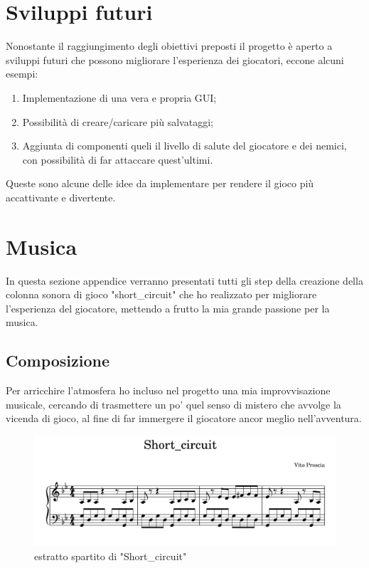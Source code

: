 \documentclass[italian,12pt,a4paper]{article}
\begin{document}
	\section{Sviluppi futuri}
	
	Nonostante il raggiungimento degli obiettivi preposti il progetto è aperto a sviluppi futuri che possono migliorare l'esperienza dei giocatori, eccone alcuni esempi:
	
	\begin{enumerate}
		\item Implementazione di una vera e propria GUI;
		\item Possibilità di creare/caricare più salvataggi;
		\item Aggiunta di componenti queli il livello di salute del giocatore e dei nemici, con possibilità di far attaccare quest'ultimi.
	\end{enumerate}
	Queste sono alcune delle idee da implementare per rendere il gioco più accattivante e divertente.
	
	\appendix
	\section{Musica}\label{appendix:musica}
	In questa sezione appendice verranno presentati tutti gli step della creazione della colonna sonora di gioco "short\_circuit" che ho realizzato per migliorare l'esperienza del giocatore, mettendo a frutto la mia grande passione per la musica.
	
	\subsection{Composizione}
	Per arricchire l'atmosfera ho incluso nel progetto una mia improvvisazione musicale, cercando di trasmettere un po' quel senso di mistero che avvolge la vicenda di gioco, al fine di far immergere il giocatore ancor meglio nell'avventura.
	
	\begin{figure}[!h]
		\centering
		\includegraphics[width=14cm]{score}
		\caption{estratto spartito di "Short\_circuit"}
		\label{fig:score}
	\end{figure}
	
\end{document}

